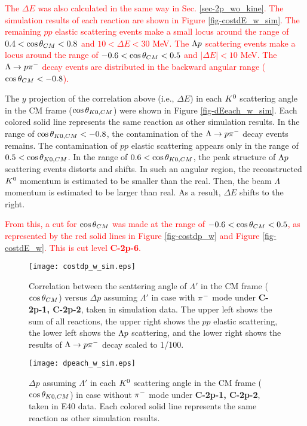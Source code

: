 \textcolor{red}{ The $\Delta E$ was also calculated in the same way in Sec. \ref{sec-2p_wo_kine}. The simulation results of each reaction are shown in Figure \ref{fig-costdE_w_sim}. The remaining $pp$ elastic scattering events make a small locus around the range of $0.4<\cos{\theta}_{CM}<0.8$ and $10<\Delta E<30$ MeV. The $\Lambda p$ scattering events make a locus around the range of $-0.6<\cos{\theta}_{CM}<0.5$ and $|\Delta E|<10$ MeV. The $\Lambda\to p\pi^{-}$ decay events are distributed in the backward angular range ($\cos{\theta}_{CM}<-0.8$). }

The $y$ projection of the correlation above (i.e., $\Delta E$) in each $K^{0}$ scattering angle in the CM frame ($\cos{\theta_{K0,CM}}$) were shown in Figure \ref{fig-dEeach_w_sim}. Each colored solid line represents the same reaction as other simulation results.
In the range of $\cos{\theta_{K0,CM}}<-0.8$, the contamination of the $\Lambda\to p\pi^{-}$ decay events remains. The contamination of $pp$ elastic scattering appears only in the range of $0.5<\cos{\theta_{K0,CM}}$. In the range of $0.6<\cos{\theta_{K0,CM}}$, the peak structure of $\Lambda p$ scattering events distorts and shifts. In such an angular region, the reconstructed $K^{0}$ momentum is estimated to be smaller than the real. Then, the beam $\Lambda$ momentum is estimated to be larger than real. As a result, $\Delta E$ shifts to the right. 

\textcolor{red}{ From this, a cut for $\cos{\theta}_{CM}$ was made at the range of $-0.6<\cos{\theta}_{CM}<0.5$, as represented by the red solid lines in Figure \ref{fig-costdp_w} and Figure \ref{fig-costdE_w}. This is cut level {\bf C-2p-6}. }


\begin{figure}[!h]
  \begin{center}
    \texttt{[image: costdp\_w\_sim.eps]}
    \caption{Correlation between the scattering angle of $\Lambda'$ in the CM frame ($\cos{\theta}_{CM}$) versus $\Delta p$ assuming $\Lambda'$ in case  with $\pi^{-}$ mode under {\bf C-2p-1, C-2p-2}, taken in simulation data. The upper left shows the sum of all reactions, the upper right shows the $pp$ elastic scattering, the lower left shows the $\Lambda p$ scattering, and the lower right shows the results of $\Lambda\to p\pi^{-}$ decay scaled to 1/100.}
    \label{fig-costdp_w_sim}
  \end{center}
\end{figure}

\begin{figure}[!h]
  \begin{center}
    \texttt{[image: dpeach\_w\_sim.eps]}
    \caption{$\Delta p$ assuming $\Lambda'$ in each $K^{0}$ scattering angle in the CM frame ($\cos{\theta_{K0,CM}}$) in case  without $\pi^{-}$ mode under {\bf C-2p-1, C-2p-2}, taken in E40 data. Each colored solid line represents the same reaction as other simulation results.}
    \label{fig-dpeach_w_sim}
  \end{center}
\end{figure}

